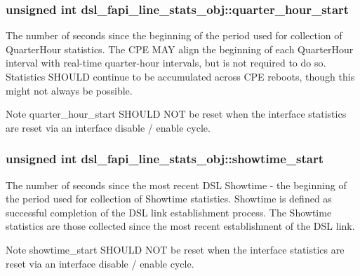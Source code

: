\hypertarget{structdsl__fapi__line__stats__obj_af8e8fdd806dfee26ef66bad4c127003f}{
\subsubsection[{quarter\-\_\-hour\-\_\-start}]{\setlength{\rightskip}{0pt plus 5cm}unsigned int dsl\-\_\-fapi\-\_\-line\-\_\-stats\-\_\-obj\-::quarter\-\_\-hour\-\_\-start}}\label{structdsl__fapi__line__stats__obj_af8e8fdd806dfee26ef66bad4c127003f}
The number of seconds since the beginning of the period used for collection of Quarter\-Hour statistics. The C\-P\-E M\-A\-Y align the beginning of each Quarter\-Hour interval with real-\/time quarter-\/hour intervals, but is not required to do so. Statistics S\-H\-O\-U\-L\-D continue to be accumulated across C\-P\-E reboots, though this might not always be possible. \begin{DoxyNote}{Note}
quarter\-\_\-hour\-\_\-start S\-H\-O\-U\-L\-D N\-O\-T be reset when the interface statistics are reset via an interface disable / enable cycle. 
\end{DoxyNote}
\hypertarget{structdsl__fapi__line__stats__obj_a92c60819d5677949b2e35c3a81dbf3a5}{
\subsubsection[{showtime\-\_\-start}]{\setlength{\rightskip}{0pt plus 5cm}unsigned int dsl\-\_\-fapi\-\_\-line\-\_\-stats\-\_\-obj\-::showtime\-\_\-start}}\label{structdsl__fapi__line__stats__obj_a92c60819d5677949b2e35c3a81dbf3a5}
The number of seconds since the most recent D\-S\-L Showtime -\/ the beginning of the period used for collection of Showtime statistics. Showtime is defined as successful completion of the D\-S\-L link establishment process. The Showtime statistics are those collected since the most recent establishment of the D\-S\-L link. \begin{DoxyNote}{Note}
showtime\-\_\-start S\-H\-O\-U\-L\-D N\-O\-T be reset when the interface statistics are reset via an interface disable / enable cycle. 
\end{DoxyNote}
